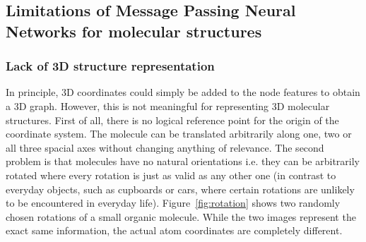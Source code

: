 \subsection{Limitations of Message Passing Neural Networks for molecular structures}
\label{sec:limitations}

\subsubsection{Lack of 3D structure representation}
\label{sec:lack-of-3d-structure}

In principle, 3D coordinates could simply be added to the node features to obtain a 3D graph. However, this is not meaningful for representing 3D molecular structures. First of all, there is no logical reference point for the origin of the coordinate system. The molecule can be translated arbitrarily along one, two or all three spacial axes without changing anything of relevance. The second problem is that molecules have no natural orientations i.e. they can be arbitrarily rotated where every rotation is just as valid as any other one (in contrast to everyday objects, such as cupboards or cars, where certain rotations are unlikely to be encountered in everyday life). Figure~\ref{fig:rotation} shows two randomly chosen rotations of a small organic molecule. While the two images represent the exact same information, the actual atom coordinates are completely different.

